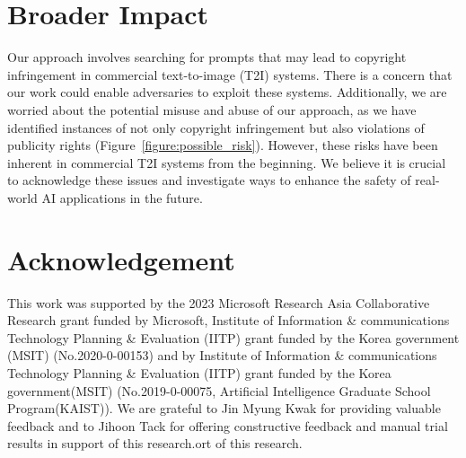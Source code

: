 \section*{Broader Impact}

Our approach involves searching for prompts that may lead to copyright infringement in commercial text-to-image (T2I) systems. There is a concern that our work could enable adversaries to exploit these systems. Additionally, we are worried about the potential misuse and abuse of our approach, as we have identified instances of not only copyright infringement but also violations of publicity rights (Figure~\ref{figure:possible_risk}). However, these risks have been inherent in commercial T2I systems from the beginning. We believe it is crucial to acknowledge these issues and investigate ways to enhance the safety of real-world AI applications in the future.

\section*{Acknowledgement}
This work was supported by the 2023 Microsoft Research Asia Collaborative Research grant funded by Microsoft, Institute of Information \& communications Technology Planning \& Evaluation (IITP) grant funded by the Korea government (MSIT) (No.2020-0-00153) and by Institute of Information \& communications Technology Planning \& Evaluation (IITP) grant funded by the Korea government(MSIT) (No.2019-0-00075, Artificial Intelligence Graduate School Program(KAIST)). We are grateful to Jin Myung Kwak for providing valuable feedback and to Jihoon Tack for offering constructive feedback and manual trial results in support of this research.ort of this research. 